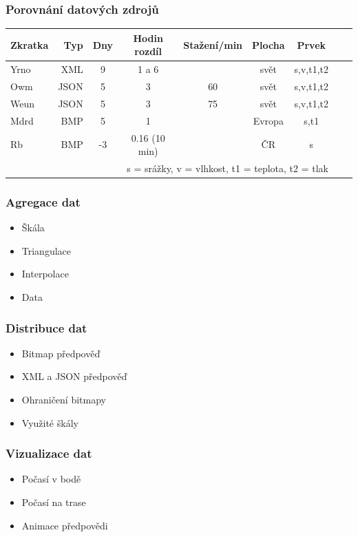 \documentclass{beamer}
\begin{document}
	\begin{frame}
		\frametitle{Porovnání datových zdrojů}
		
		\begin{tabular} {l r c c c c c c c}
			
			Zkratka & Typ & Dny & Hodin rozdíl & Stažení/min & Plocha & Prvek \\
			\hline
			Yrno & XML & 9 & 1 a 6 & & svět & s,v,t1,t2 \\ 
			Owm & JSON & 5 & 3 & 60 & svět & s,v,t1,t2 \\ 
			Weun & JSON & 5 & 3 & 75 & svět & s,v,t1,t2 \\ 
			Mdrd & BMP & 5 & 1 &  & Evropa & s,t1 \\ 
			Rb & BMP & -3 & 0.16 (10 min)& & ČR & s \\ 
			\multicolumn{7}{r}{\footnotesize *s = srážky, v = vlhkost, t1 = teplota, t2 = tlak}\\
		\end{tabular}
	\end{frame}
	
	\begin{frame}
		\frametitle{Agregace dat}
		
		\begin{itemize}
			\item Škála
			\item Triangulace
			\item Interpolace
			\item Data
		\end{itemize}
	\end{frame}

	\begin{frame}
		\frametitle{Distribuce dat}
		
		\begin{itemize}
			\item Bitmap předpověď
			\item XML a JSON předpověď
			\item Ohraničení bitmapy
			\item Využité škály
		\end{itemize}
		
	\end{frame}

	\begin{frame}
		\frametitle{Vizualizace dat}
		
		\begin{itemize}
			\item Počasí v bodě
			\item Počasí na trase
			\item Animace předpovědi
		\end{itemize}
	
	\end{frame}
\end{document}
